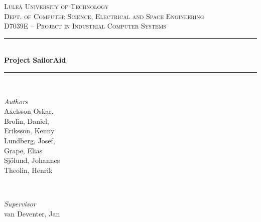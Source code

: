 \newcommand{\HRule}{\rule{\linewidth}{0.5mm}}
\center %


\textsc{\LARGE Luleå University of Technology}\\[1.5cm] %

\textsc{\Large Dept. of Computer Science, Electrical and Space Engineering}\\[0.5cm] %

\textsc{\large D7039E -- Project in Industrial Computer Systems}\\[0.5cm] %


\HRule\\[0.8cm]

{\huge\bfseries Project SailorAid}\\[0.4cm] %

\HRule\\[1.5cm]

\begin{minipage}{0.4\textwidth}
	\begin{flushleft}
		\large
		\textit{Authors}\\
		Axelsson Oskar, \\ 
		Brolin, Daniel, \\ 
		Eriksson, Kenny \\ 
		Lundberg, Josef, \\ 
		Grape, Elias \\ 
		Sjölund, Johannes \\
		Theolin, Henrik
	\end{flushleft}
\end{minipage}
~
\begin{minipage}{0.4\textwidth}
	\begin{flushright}
		\large
		\textit{Supervisor}\\
		van Deventer, Jan
	\end{flushright}
\end{minipage}


